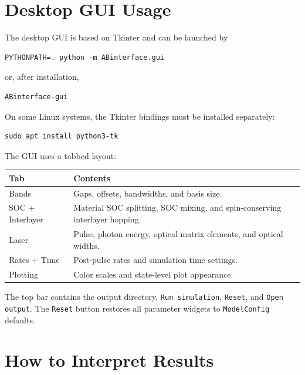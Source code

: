 \documentclass[11pt,a4paper]{article}
\begin{document}
\section{Desktop GUI Usage}

The desktop GUI is based on Tkinter and can be launched by
\begin{lstlisting}
PYTHONPATH=. python -m ABinterface.gui
\end{lstlisting}
or, after installation,
\begin{lstlisting}
ABinterface-gui
\end{lstlisting}
On some Linux systems, the Tkinter bindings must be installed separately:
\begin{lstlisting}
sudo apt install python3-tk
\end{lstlisting}

The GUI uses a tabbed layout:
\begin{center}
\begin{tabular}{ll}
\toprule
Tab & Contents \\
\midrule
Bands & Gaps, offsets, bandwidths, and basis size. \\
SOC + Interlayer & Material SOC splitting, SOC mixing, and spin-conserving interlayer hopping. \\
Laser & Pulse, photon energy, optical matrix elements, and optical widths. \\
Rates + Time & Post-pulse rates and simulation time settings. \\
Plotting & Color scales and state-level plot appearance. \\
\bottomrule
\end{tabular}
\end{center}
The top bar contains the output directory, \texttt{Run simulation}, \texttt{Reset}, and \texttt{Open output}.  The \texttt{Reset} button restores all parameter widgets to \texttt{ModelConfig} defaults.

\section{How to Interpret Results}
\end{document}
